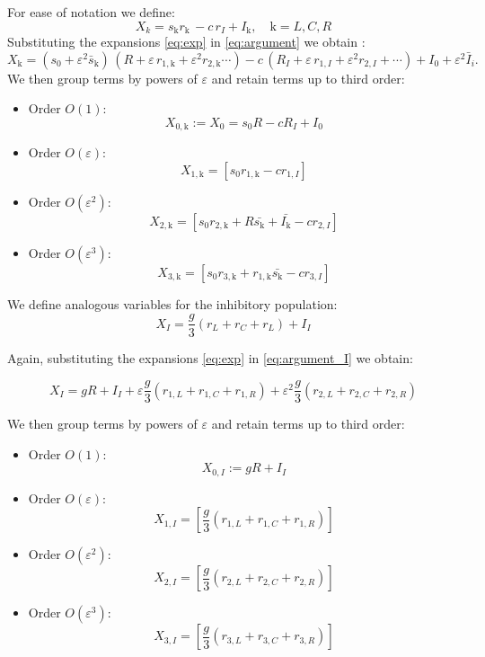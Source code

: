 \documentclass[12,twoside]{TFG-GM}
\theoremstyle{definition}
\theoremstyle{remark}
\newcommand{\kk}{\mathrm{k}}
\begin{document}
For ease of notation we define:
\begin{equation}
  X_k = s_\kk r_\kk \, - c\,r_I + I_\kk , \quad \kk  = L,C,R
  \label{eq:argument}
\end{equation}
Substituting the expansions \eqref{eq:exp} in \eqref{eq:argument} we obtain :
\[
X_\kk  = (s_0+ \varepsilon^2 \bar{s}_\kk )\,(R + \varepsilon\,r_{1,\kk } +\varepsilon^2 r_{2,\kk } \cdots) - c\,(R_I + \varepsilon\,r_{1,I}+\varepsilon^2 r_{2,I} +\cdots) + I_0 +\varepsilon^2 \bar{I}_i .
\]
We then group terms by powers of $\varepsilon$ and retain terms up to third order:
\begin{itemize}
  \item Order \(O(1)\):
    \[
X_{0,\kk } := X_{0} = s_0 R - c R_I +I_0
    \]
  \item Order \(O(\varepsilon)\):
    \[
   X_{1,\kk } =[s_0 r_{1,\kk }- cr_{1,I}]
    \]
  \item Order \(O(\varepsilon^2)\): 
\[
X_{2,\kk } =  [s_0 r_{2,\kk }+ R\bar{s_\kk } + \bar{I_\kk } - cr_{2,I}]
\]
  \item Order \(O(\varepsilon^3)\): 
\[
X_{3,\kk } =  [s_0 r_{3,\kk }+ r_{1,\kk }\bar{s_\kk }-cr_{3,I}]
\]
\end{itemize}


We define analogous variables for the inhibitory population:
\begin{equation}
  X_I = \frac g3 (r_L+r_C+r_L)+I_I
  \label{eq:argument_I}
\end{equation}

Again, substituting the expansions \eqref{eq:exp} in \eqref{eq:argument_I} we obtain:

\[
  X_I = gR+I_I + \varepsilon\frac g3 (r_{1,L}+ r_{1,C}+r_{1,R}) + \varepsilon^2 \frac g3 (r_{2,L} + r_{2,C}+ r_{2,R})
  \label{eq:argument_I_exp}
\]

We then group terms by powers of $\varepsilon$ and retain terms up to third order:

\begin{itemize}
  \item Order \(O(1)\):
    \[
X_{0,I} := gR+ I_I 
    \]
  \item Order \(O(\varepsilon)\):
    \[
   X_{1, I} =[\frac g3(r_{1,L}+ r_{1,C}+r_{1,R})]
    \]
  \item Order \(O(\varepsilon^2)\): 
\[
   X_{2, I} =[\frac g3(r_{2,L}+ r_{2,C}+r_{2,R})]
\]
  \item Order \(O(\varepsilon^3)\): 
\[
X_{3,I} =  [\frac g3(r_{3,L}+ r_{3,C}+r_{3,R})]
\]
\end{itemize}
\end{document}
